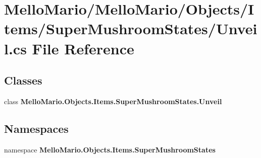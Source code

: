 \section{Mello\+Mario/\+Mello\+Mario/\+Objects/\+Items/\+Super\+Mushroom\+States/\+Unveil.cs File Reference}
\label{SuperMushroomStates_2Unveil_8cs}
\subsection*{Classes}
\begin{DoxyCompactItemize}
\item 
class \textbf{ Mello\+Mario.\+Objects.\+Items.\+Super\+Mushroom\+States.\+Unveil}
\end{DoxyCompactItemize}
\subsection*{Namespaces}
\begin{DoxyCompactItemize}
\item 
namespace \textbf{ Mello\+Mario.\+Objects.\+Items.\+Super\+Mushroom\+States}
\end{DoxyCompactItemize}
